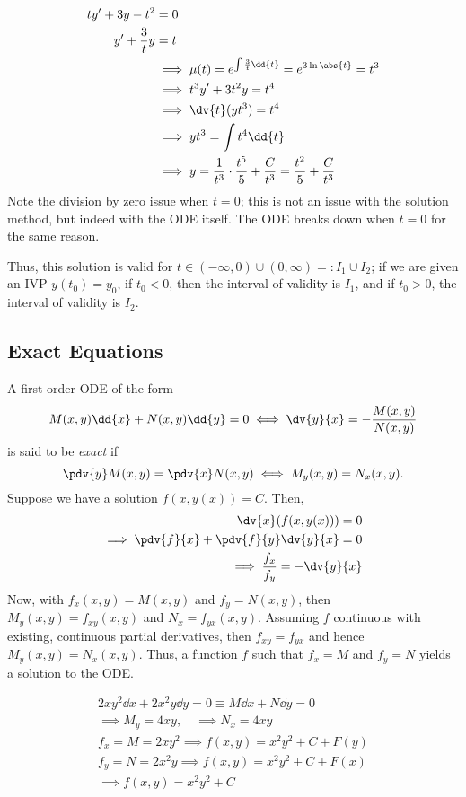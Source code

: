\begin{example}
    \begin{align*}
        ty' + 3y - t^2 &= 0\\
        y' +  \frac{3}{t}y &= t\\
        &\implies \mu(t) = e^{\int \frac{3}{t} \dd{t}} = e^{3 \ln \abs{t}} = t^3\\
        &\implies t^3y'+ 3t^2y = t^4\\
        &\implies \dv{t}(yt^3) = t^4\\
        &\implies yt^3 = \int t^4 \dd{t}\\
        &\implies y = \frac{1}{t^3} \cdot \frac{t^5}{5} + \frac{C}{t^3} = \frac{t^2}{5} + \frac{C}{t^3}
    \end{align*}
    Note the division by zero issue when $t = 0$; this is not an issue with the solution method, but indeed with the ODE itself. The ODE breaks down when $t = 0$ for the same reason.

    Thus, this solution is valid for $t \in (-\infty, 0) \cup (0, \infty) =: I_1 \cup I_2$; if we are given an IVP $y(t_0) = y_0$, if $t_0 < 0$, then the interval of validity is $I_1$, and if $t_0 > 0$, the interval of validity is $I_2$.
\end{example}

\subsection{Exact Equations}

\begin{definition}
    A first order ODE of the form \[
    M(x, y) \dd{x} + N(x, y) \dd{y} = 0 \iff \dv{y}{x} = - \frac{M(x, y)}{N(x,y)}     
    \]
    is said to be \emph{exact} if $$\pdv{y} M(x, y) = \pdv{x} N(x, y) \iff M_y(x,y) = N_x(x, y).$$
    Suppose we have a solution $f(x, y(x)) = C$. Then, \begin{align*}
        \dv{x}(f(x, y(x))) = 0\\
        \implies \pdv{f}{x} + \pdv{f}{y}\dv{y}{x} = 0\\
        \implies \frac{f_x}{f_y} = -\dv{y}{x}
    \end{align*}
    Now, with $f_x(x,y) = M(x, y)$ and $f_y = N(x, y)$, then $M_y(x, y) = f_{xy}(x,y)$ and $N_x = f_{yx}(x,y)$. Assuming $f$ continuous with existing, continuous partial derivatives, then $f_{xy} = f_{yx}$ and hence $M_{y}(x, y) = N_x(x, y)$. Thus, a function $f$ such that $f_x = M$ and $f_y = N$ yields a solution to the ODE.
\end{definition}

\begin{example}
    \begin{align*}
        2xy^2 \dd{x} + 2x^2 y \dd{y} = 0 \equiv M \dd{x} + N \dd{y} = 0\\
        \implies M_y = 4xy, \quad \implies N_x = 4xy\\
        f_x = M = 2x y^2 \implies f(x, y) = x^2y^2 + C + F(y)\\
        f_y = N = 2x^2y\implies f(x, y) = x^2y^2 + C + F(x)\\
        \implies f(x, y) = x^2y^2 + C
    \end{align*}
\end{example}